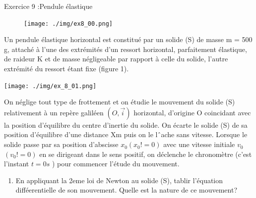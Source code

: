 \documentclass[12pt, french]{article}
\begin{document}
\begin{Box2}{Exercice 9 :Pendule élastique}
\begin{figure}

  \begin{center}
	  \vspace{-0.6cm}
	\texttt{[image: ./img/ex8\_00.png]}
  \end{center}
\end{figure}
Un pendule élastique horizontal est constitué par un solide (S) de masse m = 500 g, attaché à l’une des extrémités
d’un ressort horizontal, parfaitement élastique, de raideur K et de masse négligeable par rapport à celle du solide,
l’autre extrémité du ressort étant fixe (figure 1).

  \begin{center}
    \vspace{-0.2cm}
	\texttt{[image: ./img/ex\_8\_01.png]}
  \end{center}

	  \vspace{-1cm}
On néglige tout type de frottement et on étudie le mouvement du solide (S) relativement à un repère galiléen
     $(O, \vec{i})$ horizontal, d’origine O coincidant avec la position d’équilibre du centre d’inertie du solide.
On écarte le solide (S) de sa position d’équilibre d’une distance Xm puis on le lˆache sans vitesse.
     Lorsque le solide passe par sa position d’abscisse $x_0(x_0 != 0)$ avec une vitesse initiale $v_0$ $(v_0 != 0)$ en se dirigeant
dans le sens positif, on déclenche le chronomètre (c’est l’instant $t = 0s$ ) pour commencer l’étude du mouvement.

\begin{enumerate}
  \item  En appliquant la 2eme  loi de Newton au solide (S), tablir l’équation difféerentielle de son mouvement.
Quelle est la nature de ce mouvement?


\end{enumerate}
\end{Box2}
\end{document}
